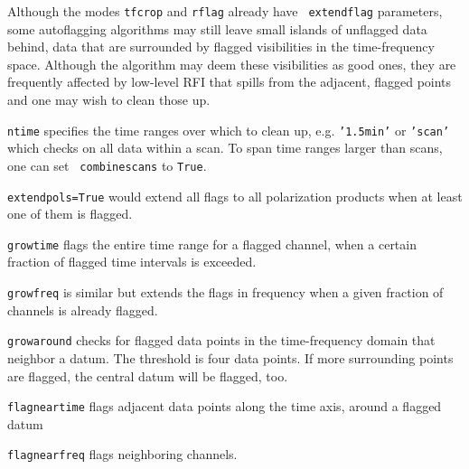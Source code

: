 Although the modes {\tt tfcrop} and {\tt rflag} already have {\tt
  extendflag} parameters, some autoflagging algorithms may still leave
small islands of unflagged data behind, data that are surrounded by
flagged visibilities in the time-frequency space. Although the
algorithm may deem these visibilities as good ones, they are
frequently affected by low-level RFI that spills from the adjacent,
flagged points and one may wish to clean those up.


{\tt ntime} specifies the time ranges over which to clean up,
e.g. {\tt '1.5min'} or {\tt 'scan'} which checks on all data within a
scan. To span time ranges larger than scans, one can set {\tt
  combinescans} to {\tt True}.

{\tt extendpols=True} would extend all flags to all polarization
products when at least one of them is flagged.

{\tt growtime} flags the entire time range for a flagged channel,
when a certain fraction of flagged time intervals is exceeded. 

{\tt growfreq} is similar but extends the flags in frequency when a given
fraction of channels is already flagged.

{\tt growaround} checks for flagged data points in the time-frequency
domain that neighbor a datum. The threshold is four data points. If
more surrounding points are flagged, the central datum will be
flagged, too.

{\tt flagneartime} flags adjacent data points along the time axis, around a flagged datum

{\tt  flagnearfreq} flags neighboring channels. 


